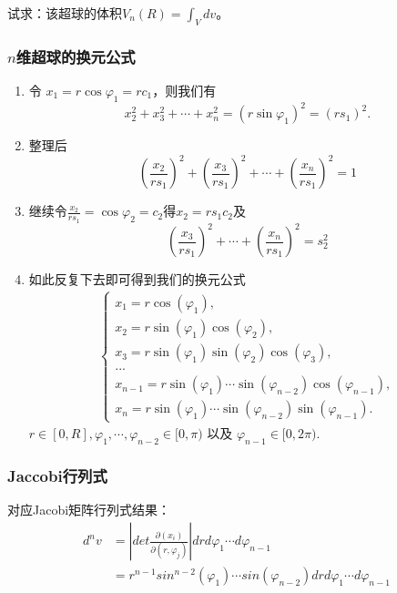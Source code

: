 \documentclass[12pt]{ctexart}
\numberwithin{equation}{section} %
\begin{document}
试求：该超球的体积$V_n(R)=\int_Vdv$。
\subsubsection{$n$维超球的换元公式}
\begin{enumerate}
    \item 令 $x_1 = r \cos \varphi_1 = rc_1$，则我们有
    \[
    x_2^2 + x_3^2 + \cdots + x_n^2 = (r \sin \varphi_1)^2 = (rs_1)^2.
    \]
    \item 整理后
    $$(\frac{x_2}{rs_1})^2+(\frac{x_3}{rs_1})^2+\cdots+(\frac{x_n}{rs_1})^2=1$$
   \item 继续令$\frac{x_2}{rs_1}=\cos\varphi_2=c_2$得$x_2=rs_1c_2$及
$$(\frac{x_3}{rs_1})^2+\cdots+(\frac{x_n}{rs_1})^2=s_2^2$$
   \item 如此反复下去即可得到我们的换元公式
   \begin{equation}
    \begin{aligned}
        \begin{cases}
            x_{1}=r\cos(\varphi_1), \\
            x_{2}=r\sin(\varphi_1)\cos(\varphi_2), \\
            x_{3}=r\sin(\varphi_1)\sin(\varphi_2)\cos(\varphi_3), \\
            ...\\
            x_{n-1}=r\sin(\varphi_1)\cdots\sin(\varphi_{n-2})\cos(\varphi_{n-1}), \\
            x_{n}=r\sin(\varphi_1)\cdots\sin(\varphi_{n-2})\sin(\varphi_{n-1}). 
       \end{cases}
     \end{aligned}   
   \end{equation}
   $r \in [0,R],\varphi_1,\cdots,\varphi_{n-2}\in[0,\pi)\text{ 以及 }\varphi_{n-1}\in[0,2\pi).$
\end{enumerate}
\subsubsection{Jaccobi行列式}
对应Jacobi矩阵行列式结果：
\begin{equation}
\begin{split}
    d^nv&=|det\frac{\partial(x_i)}{\partial(r,\varphi_j)}|drd\varphi_1\cdots d\varphi_{n-1}\\
    &=r^{n-1}sin^{n-2}(\varphi_1)\cdots sin(\varphi_{n-2})drd\varphi_1\cdots d\varphi_{n-1}
\end{split}
\end{equation}
\end{document}
